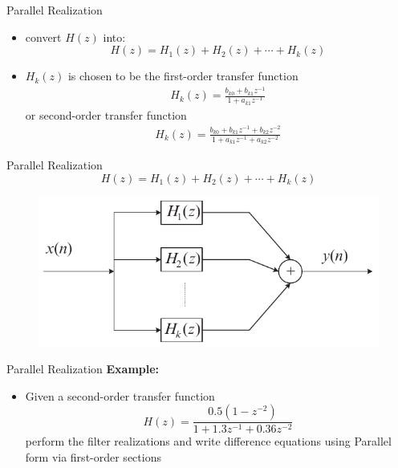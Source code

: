 \documentclass[pdflatex,compress,mathserif]{beamer}
\begin{document}
\begin{frame}{Parallel Realization}
  \begin{itemize}
    \item convert $H(z)$ into:
    \begin{equation*}
      H(z) = H_1(z) + H_2(z) + \cdots + H_k(z)
    \end{equation*}
    \item $H_k(z)$ is chosen to be the first-order transfer function
    \begin{align*}
      H_k(z) = \frac{b_{k0} + b_{k1}z^{-1}}{1 + a_{k1}z^{-1}}
    \end{align*}
    or second-order transfer function
    \begin{align*}
      H_k(z) = \frac{b_{k0} + b_{k1}z^{-1} + b_{k2}z^{-2}}{1 + a_{k1}z^{-1} + a_{k2}z^{-2}}
    \end{align*}
  \end{itemize}
\end{frame}

\begin{frame}{Parallel Realization}
  \begin{equation*}
    H(z) = H_1(z) + H_2(z) + \cdots + H_k(z)
  \end{equation*}
  \begin{figure}
    \centering
    \includegraphics[width=0.8\linewidth]{./img/img06.png}
  \end{figure}
\end{frame}

\begin{frame}{Parallel Realization}
  \textbf{Example:}
  \begin{itemize}
    \item Given a second-order transfer function $$ H(z) = \frac{0.5(1-z^{-2})}{1 + 1.3z^{-1} + 0.36 z^{-2}} $$ perform the filter realizations and write difference equations using Parallel form via first-order sections
  \end{itemize}
\end{frame}
\end{document}
